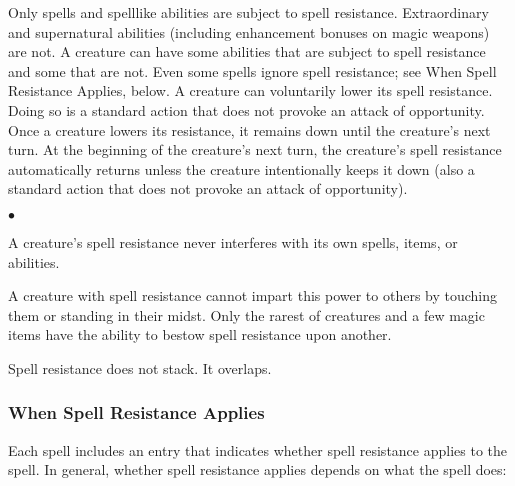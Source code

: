 Only spells and spell\textendash like abilities are subject to spell resistance. Extraordinary and supernatural abilities (including enhancement bonuses on magic weapons) are not. A creature can have some abilities that are subject to spell resistance and some that are not. Even some spells ignore spell resistance; see When Spell Resistance Applies, below. 
A creature can voluntarily lower its spell resistance. Doing so is a standard action that does not provoke an attack of opportunity. Once a creature lowers its resistance, it remains down until the creature's next turn. At the beginning of the creature's next turn, the creature's spell resistance automatically returns unless the creature intentionally keeps it down (also a standard action that does not provoke an attack of opportunity).

\begin{list}{$\bullet$}{\itemspace}
	\item A creature's spell resistance never interferes with its own spells, items, or abilities.
	\item A creature with spell resistance cannot impart this power to others by touching them or standing in their midst. Only the rarest of creatures and a few magic items have the ability to bestow spell resistance upon another.
	\item Spell resistance does not stack. It overlaps. 
\end{list}

\subsubsection{When Spell Resistance Applies}

Each spell includes an entry that indicates whether spell resistance applies to the spell. In general, whether spell resistance applies depends on what the spell does:




